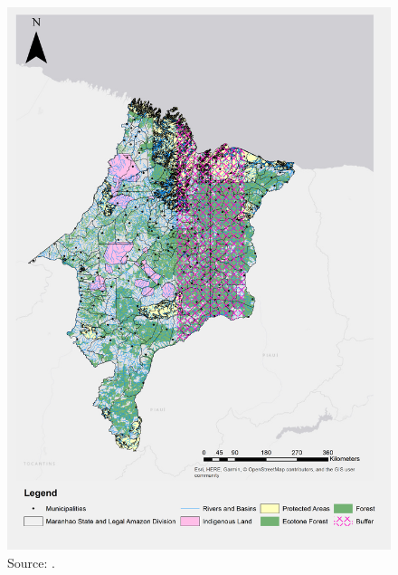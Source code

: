 \begin{figure}[H]
  \centering
  \includegraphics[width=1\textwidth, inner]{MaranhaoChapter2_Fig2.png}
\caption{Source: \citep{MMMAwebsite,nugeo_2018,embrapa_2018}.}
\label{fig:buffer}
\end{figure}




